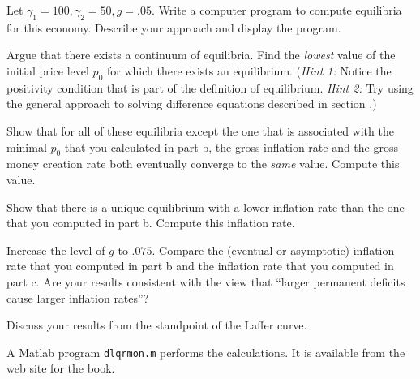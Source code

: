  Let $\gamma_1 =100, \gamma_2 = 50, g = .05$.
Write a computer program to compute  equilibria for this economy.
Describe your approach and display the program.

\smallskip

  Argue that there exists a continuum of
equilibria. Find the {\it lowest} value of the initial price level
$p_0$ for which there exists an equilibrium.  ({\it Hint
1:}  Notice the positivity condition that is part of the
definition of equilibrium. {\it Hint  2:} Try using the
general approach to solving difference equations described in
section .)

  Show that for all of these equilibria except
the one that is associated with the minimal $p_0$ that you
calculated in part b, the gross inflation rate and the gross money
creation rate both eventually converge to the {\it same} value.
Compute this value.

\smallskip
{}  Show that there is a unique equilibrium with a
lower inflation rate than the one that you computed in part b.
Compute this inflation rate.

\smallskip
{}  Increase the level of $g$ to $.075$.  Compare
the
 (eventual or asymptotic) inflation rate that you computed
in part b and the  inflation rate that you computed in part c.
Are your results consistent with the view that ``larger permanent deficits
cause larger inflation rates''?

\smallskip
{}  Discuss your results from the standpoint of the
Laffer curve.

\smallskip
{} A Matlab program {\tt dlqrmon.m} performs the calculations.
It is available from the web site for the book.
\medskip

